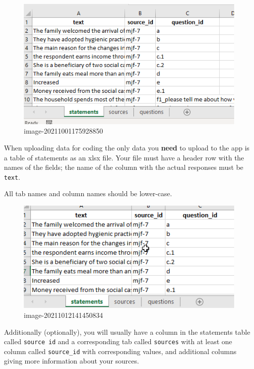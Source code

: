 \documentclass[
]{book}
\begin{document}
\begin{figure}
\centering
\includegraphics[width=6.77083in,height=\textheight]{_assets/standardimport.gif}
\caption{image-20211001175928850}
\end{figure}

When uploading data for coding the only data you \textbf{need} to upload to the app is a table of statements as an xlsx file. Your file must have a header row with the names of the fields; the name of the column with the actual responses must be \texttt{text}.

All tab names and column names should be lower-case.

\begin{figure}
\centering
\includegraphics[width=6.77083in,height=\textheight]{_assets/image-20211012141450834.png}
\caption{image-20211012141450834}
\end{figure}

Additionally (optionally), you will usually have a column in the statements table called \texttt{source\ id} and a corresponding tab called \texttt{sources} with at least one column called \texttt{source\_id} with corresponding values, and additional columns giving more information about your sources.
\end{document}
